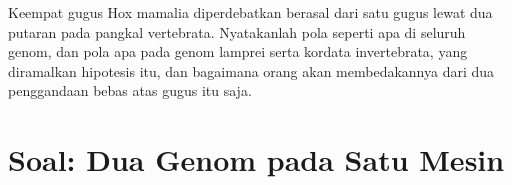 \begin{exercise}[$\star\star\star$]\label{exo:b3:genomics:12}
Keempat gugus Hox mamalia diperdebatkan berasal dari satu gugus lewat dua
putaran  pada pangkal vertebrata. Nyatakanlah pola
 seperti apa di seluruh genom, dan pola apa pada genom lamprei serta
kordata invertebrata, yang diramalkan hipotesis itu, dan bagaimana orang akan
membedakannya dari dua penggandaan bebas atas gugus itu saja.
\end{exercise}

\section{Soal: Dua Genom pada Satu Mesin}


